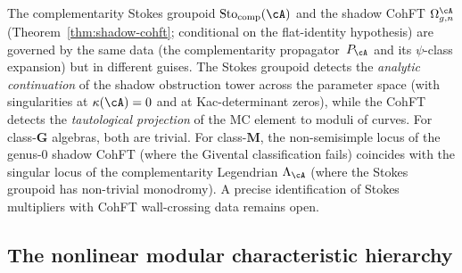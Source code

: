 \begin{remark}
\label{rem:stokes-r-matrix}
The complementarity Stokes groupoid
$\operatorname{Sto}_{\mathrm{comp}}(\cA)$ and the shadow CohFT
$\Omega_{g,n}^{\cA}$ (Theorem~\ref{thm:shadow-cohft};
conditional on the flat-identity hypothesis) are
governed by the same data (the complementarity
propagator~$P_\cA$ and its $\psi$-class expansion) but in
different guises. The Stokes groupoid detects the
\emph{analytic continuation} of the shadow obstruction tower across
the parameter space (with singularities at
$\kappa(\cA) = 0$ and at Kac-determinant zeros), while
the CohFT detects the \emph{tautological projection} of the
MC element to moduli of curves. For class-$\mathbf{G}$
algebras, both are trivial. For class-$\mathbf{M}$, the
non-semisimple locus of the genus-$0$ shadow CohFT
(where the Givental classification fails) coincides with
the singular locus of the complementarity Legendrian
$\Lambda_\cA$ (where the Stokes groupoid has
non-trivial monodromy). A precise identification of
Stokes multipliers with CohFT wall-crossing data
remains open.
\end{remark}

\subsection{The nonlinear modular characteristic hierarchy}
\label{subsec:nonlinear-modular-hierarchy}

